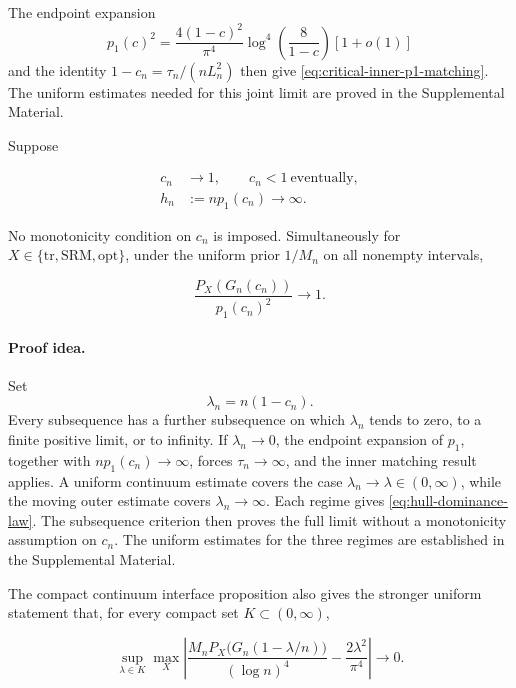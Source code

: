 The endpoint expansion
\[
p_1(c)^2
=
\frac{4(1-c)^2}{\pi^4}
\log^4\!\left(\frac{8}{1-c}\right)
[1+o(1)]
\]
and the identity
\(1-c_n=\tau_n/(nL_n^2)\) then give
\eqref{eq:critical-inner-p1-matching}. The uniform estimates needed for this
joint limit are proved in the Supplemental Material.

\begin{theorem}
\label{thm:unknown-length-hull-dominance}
Suppose

\begin{equation}\label{eq:hull-dominance-assumptions}
 \begin{aligned}
 c_n&\to1,\qquad c_n<1\ \text{eventually},\\
 h_n&:=n p_1(c_n)\to\infty.
 \end{aligned}
\end{equation}

No monotonicity condition on \(c_n\) is imposed. Simultaneously for
\(X\in\{\mathrm{tr},\mathrm{SRM},\mathrm{opt}\}\), under the uniform prior
\(1/M_n\) on all nonempty intervals,

\begin{equation}\label{eq:hull-dominance-law}
 \frac{P_X(G_n(c_n))}{p_1(c_n)^2}\longrightarrow1.
\end{equation}
\end{theorem}

\paragraph{Proof idea.}
Set
\[
\lambda_n=n(1-c_n).
\]
Every subsequence has a further subsequence on which \(\lambda_n\) tends to
zero, to a finite positive limit, or to infinity. If
\(\lambda_n\to0\), the endpoint expansion of \(p_1\), together with
\(n p_1(c_n)\to\infty\), forces \(\tau_n\to\infty\), and the inner matching
result applies. A uniform continuum estimate covers the case
\(\lambda_n\to\lambda\in(0,\infty)\), while the moving outer estimate covers
\(\lambda_n\to\infty\). Each regime gives
\eqref{eq:hull-dominance-law}. The subsequence criterion then proves the full
limit without a monotonicity assumption on \(c_n\). The uniform estimates for
the three regimes are established in the Supplemental Material.

The compact continuum interface proposition also gives the stronger uniform
statement that, for every compact set \(K\subset(0,\infty)\),

\begin{equation}\label{eq:continuum-interface-law}
 \sup_{\lambda\in K}\max_X
 \left|
 \frac{M_nP_X\bigl(G_n(1-\lambda/n)\bigr)}{(\log n)^4}
 -\frac{2\lambda^2}{\pi^4}
 \right|\longrightarrow0.
\end{equation}

